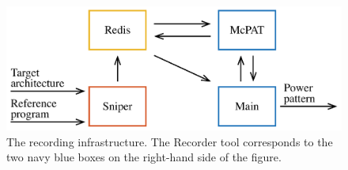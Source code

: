 \begin{figure}
  \centering
  \includegraphics[width=1.0\columnwidth]{include/assets/figures/recorder.pdf}
  \caption{The recording infrastructure. The Recorder tool corresponds to the
  two navy blue boxes on the right-hand side of the figure.}
\end{figure}
